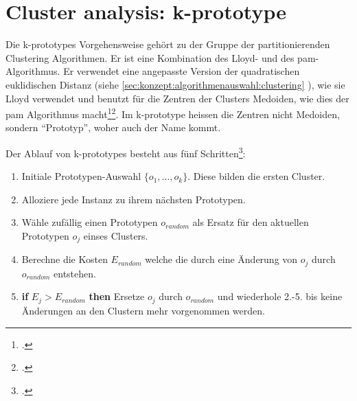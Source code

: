 %
%
%


\section{Cluster analysis: k-prototype}
\label{sec:recherche:algorithmen:k-prototypes}
Die k-prototypes Vorgehensweise gehört zu der Gruppe der partitionierenden Clustering Algorithmen. Er ist eine Kombination des Lloyd- und des \gls{pam}- Algorithmus. Er verwendet eine angepasste Version der quadratischen euklidischen Distanz (siehe \cref{sec:konzept:algorithmenauswahl:clustering} ), wie sie Lloyd verwendet und benutzt für die Zentren der Clusters Medoiden, wie dies der \gls{pam} Algorithmus macht\footcite{data_mining_concepts_and_techniques}\footcite{clustering_numeric_and_categorical_values}. Im k-prototype heissen die Zentren nicht Medoiden, sondern "`Prototyp"', woher auch der Name kommt.

Der Ablauf von k-prototypes besteht aus fünf Schritten\footcite{clustering_numeric_and_categorical_values}:
\begin{enumerate}
	\item Initiale Prototypen-Auswahl $\{o_1,\ldots,o_k\}$. Diese bilden die ersten Cluster.
	\item Alloziere jede Instanz zu ihrem nächsten Prototypen.
	\item Wähle zufällig einen Prototypen $o_{random}$ als Ersatz für den aktuellen Prototypen $o_j$ einses Clusters.
	\item Berechne die Kosten $E_{random}$ welche die durch eine Änderung von $o_j$ durch $o_{random}$ entstehen.
	\item \textbf{if} $E_j > E_{random}$ \textbf{then} Ersetze $o_j$ durch $o_{random}$ und wiederhole 2.-5. bis keine Änderungen an den Clustern mehr vorgenommen werden.
\end{enumerate}

